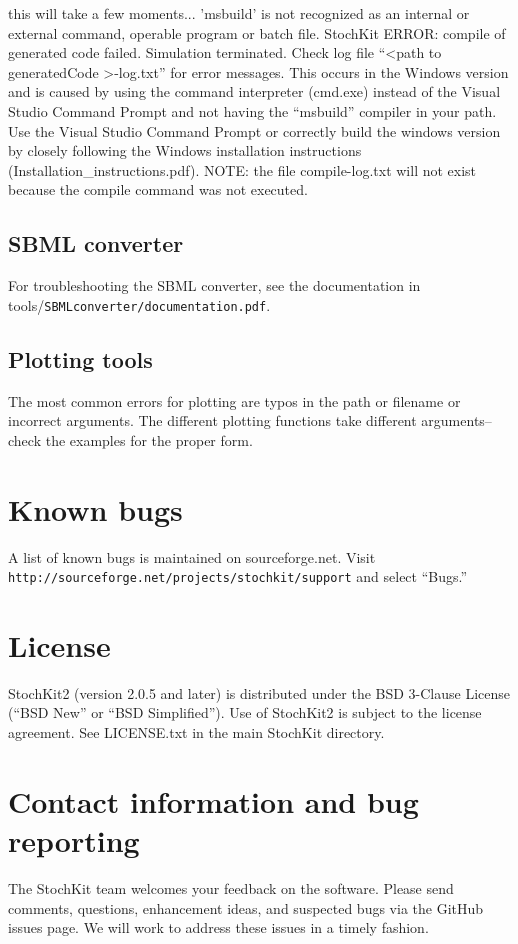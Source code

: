 \documentclass[11pt,letterpaper]{article}
\begin{document}
\begin{itemize}
{    this will take a few moments...
'msbuild' is not recognized as an internal or external command, operable program or batch file.
StochKit ERROR: compile of generated code failed. Simulation terminated.
Check log file ``<path to generatedCode >\compile-log.txt'' for error messages.}
This occurs in the Windows version and is caused by using the command interpreter (cmd.exe) instead of the Visual Studio Command Prompt and not having the ``msbuild'' compiler in your path.  Use the Visual Studio Command Prompt or correctly build the windows version by closely following the Windows installation instructions (Installation\_instructions.pdf).  NOTE: the file compile-log.txt will not exist because the compile command was not executed. 

\subsection{SBML converter}
For troubleshooting the SBML converter, see the documentation in  tools/\texttt{SBMLconverter/documentation.pdf}.

\subsection{Plotting tools}
The most common errors for plotting are typos in the path or filename or incorrect arguments.  The different plotting functions take different arguments--check the examples for the proper form.

\section{Known bugs}
A list of known bugs is maintained on sourceforge.net.  Visit \texttt{http://sourceforge.net/projects/stochkit/support} and select ``Bugs.''

\section{License}
StochKit2 (version 2.0.5 and later) is distributed under the BSD 3-Clause License (``BSD New'' or ``BSD Simplified''). Use of StochKit2 is subject to the license agreement.  See LICENSE.txt in the main StochKit directory.

\section{Contact information and bug reporting}
The StochKit team welcomes your feedback on the software.  Please send comments, questions, enhancement ideas, and suspected bugs via the GitHub issues page. We will work to address these issues in a timely fashion.


\end{itemize}
\end{document}
